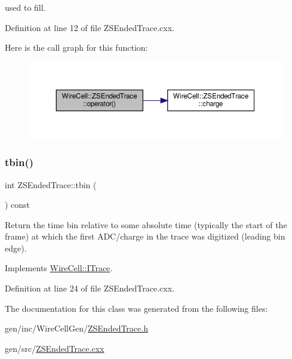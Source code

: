 used to fill. 



Definition at line 12 of file Z\+S\+Ended\+Trace.\+cxx.

Here is the call graph for this function\+:
\nopagebreak
\begin{figure}[H]
\begin{center}
\leavevmode
\includegraphics[width=350pt]{class_wire_cell_1_1_z_s_ended_trace_ae621cf5fc681fb31197731b313c5093e_cgraph}
\end{center}
\end{figure}
\mbox{\label{class_wire_cell_1_1_z_s_ended_trace_ac0ae929485ed907726568f02193e931f}} 
\subsubsection{\texorpdfstring{tbin()}{tbin()}}
{\footnotesize\ttfamily int Z\+S\+Ended\+Trace\+::tbin (\begin{DoxyParamCaption}{ }\end{DoxyParamCaption}) const\hspace{0.3cm}{\ttfamily [virtual]}}

Return the time bin relative to some absolute time (typically the start of the frame) at which the first A\+D\+C/charge in the trace was digitized (leading bin edge). 

Implements \hyperlink{class_wire_cell_1_1_i_trace_ab8ffd89fdf73ef4b7b55af2f9c4312df}{Wire\+Cell\+::\+I\+Trace}.



Definition at line 24 of file Z\+S\+Ended\+Trace.\+cxx.



The documentation for this class was generated from the following files\+:\begin{DoxyCompactItemize}
\item 
gen/inc/\+Wire\+Cell\+Gen/\hyperlink{_z_s_ended_trace_8h}{Z\+S\+Ended\+Trace.\+h}\item 
gen/src/\hyperlink{_z_s_ended_trace_8cxx}{Z\+S\+Ended\+Trace.\+cxx}\end{DoxyCompactItemize}
